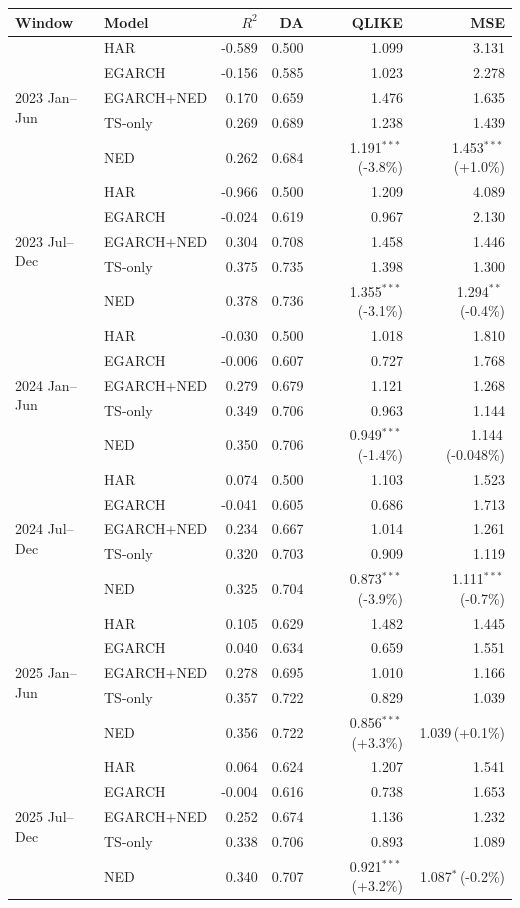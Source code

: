 \begin{tabular}{@{}llrrrr@{}}
\toprule
Window & Model & $R^2$ & DA & QLIKE & MSE \\
\midrule
\multirow{5}{*}{2023 Jan--Jun} & HAR & -0.589 & 0.500 & 1.099 & 3.131 \\
 & EGARCH & -0.156 & 0.585 & 1.023 & 2.278 \\
 & EGARCH+NED & 0.170 & 0.659 & 1.476 & 1.635 \\
 & TS-only & 0.269 & 0.689 & 1.238 & 1.439 \\
 & NED & 0.262 & 0.684 & 1.191$^{***}$\,(-3.8\%) & 1.453$^{***}$\,(+1.0\%) \\
\midrule
\multirow{5}{*}{2023 Jul--Dec} & HAR & -0.966 & 0.500 & 1.209 & 4.089 \\
 & EGARCH & -0.024 & 0.619 & 0.967 & 2.130 \\
 & EGARCH+NED & 0.304 & 0.708 & 1.458 & 1.446 \\
 & TS-only & 0.375 & 0.735 & 1.398 & 1.300 \\
 & NED & 0.378 & 0.736 & 1.355$^{***}$\,(-3.1\%) & 1.294$^{**}$\,(-0.4\%) \\
\midrule
\multirow{5}{*}{2024 Jan--Jun} & HAR & -0.030 & 0.500 & 1.018 & 1.810 \\
 & EGARCH & -0.006 & 0.607 & 0.727 & 1.768 \\
 & EGARCH+NED & 0.279 & 0.679 & 1.121 & 1.268 \\
 & TS-only & 0.349 & 0.706 & 0.963 & 1.144 \\
 & NED & 0.350 & 0.706 & 0.949$^{***}$\,(-1.4\%) & 1.144\,(-0.048\%) \\
\midrule
\multirow{5}{*}{2024 Jul--Dec} & HAR & 0.074 & 0.500 & 1.103 & 1.523 \\
 & EGARCH & -0.041 & 0.605 & 0.686 & 1.713 \\
 & EGARCH+NED & 0.234 & 0.667 & 1.014 & 1.261 \\
 & TS-only & 0.320 & 0.703 & 0.909 & 1.119 \\
 & NED & 0.325 & 0.704 & 0.873$^{***}$\,(-3.9\%) & 1.111$^{***}$\,(-0.7\%) \\
\midrule
\multirow{5}{*}{2025 Jan--Jun} & HAR & 0.105 & 0.629 & 1.482 & 1.445 \\
 & EGARCH & 0.040 & 0.634 & 0.659 & 1.551 \\
 & EGARCH+NED & 0.278 & 0.695 & 1.010 & 1.166 \\
 & TS-only & 0.357 & 0.722 & 0.829 & 1.039 \\
 & NED & 0.356 & 0.722 & 0.856$^{***}$\,(+3.3\%) & 1.039\,(+0.1\%) \\
\midrule
\multirow{5}{*}{2025 Jul--Dec} & HAR & 0.064 & 0.624 & 1.207 & 1.541 \\
 & EGARCH & -0.004 & 0.616 & 0.738 & 1.653 \\
 & EGARCH+NED & 0.252 & 0.674 & 1.136 & 1.232 \\
 & TS-only & 0.338 & 0.706 & 0.893 & 1.089 \\
 & NED & 0.340 & 0.707 & 0.921$^{***}$\,(+3.2\%) & 1.087$^{*}$\,(-0.2\%) \\
\bottomrule
\end{tabular}

